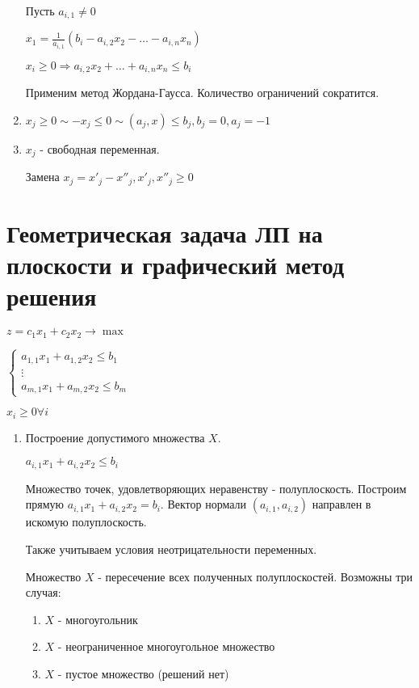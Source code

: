 \documentclass[11pt]{article}
\begin{document}
\begin{sloppypar}
\begin{enumerate}
    Пусть $a_{i, 1} \neq 0$
    
    $x_1 = \frac{1}{a_{i, 1}}(b_i - a_{i, 2}x_2 - \dots - a_{i, n}x_n)$
    
    $x_i \geq 0 \Rightarrow a_{i, 2}x_2 + \dots + a_{i, n}x_n \leq b_i$
    
    Применим метод Жордана-Гаусса. Количество ограничений сократится.
    
  \item $x_j \geq 0 \sim - x_j \leq 0 \sim (a_j, x) \leq b_j, b_j = 0, a_j = -1$
  
  \item $x_j$ - свободная переменная.
  
    Замена $x_j = x'_j - x''_j, x'_j, x''_j \geq 0$
\end{enumerate}

\section*{Геометрическая задача ЛП на плоскости и графический метод решения}
$z = c_1 x_1 + c_2 x_2 \rightarrow \max$

$\begin{cases}
  a_{1, 1}x_1 + a_{1, 2}x_2 \leq b_1 \\
  \vdots \\
  a_{m, 1}x_1 + a_{m, 2}x_2 \leq b_m
\end{cases}$

$x_i \geq 0 \forall i$

\begin{enumerate}
  \item Построение допустимого множества $X$.
  
  $a_{i, 1}x_1 + a_{i, 2}x_2 \leq b_i$
  
  Множество точек, удовлетворяющих неравенству - полуплоскость. Построим прямую $a_{i, 1}x_1 + a_{i, 2}x_2 = b_i$. Вектор нормали $(a_{i, 1}, a_{i, 2})$ направлен в искомую полуплоскость.
  
  Также учитываем условия неотрицательности переменных.
  
  Множество $X$ - пересечение всех полученных полуплоскостей. Возможны три случая:
  \begin{enumerate}
    \item $X$ - многоугольник
    \item $X$ - неограниченное многоугольное множество
    \item $X$ - пустое множество (решений нет)
  \end{enumerate}


\end{enumerate}
\end{sloppypar}
\end{document}
